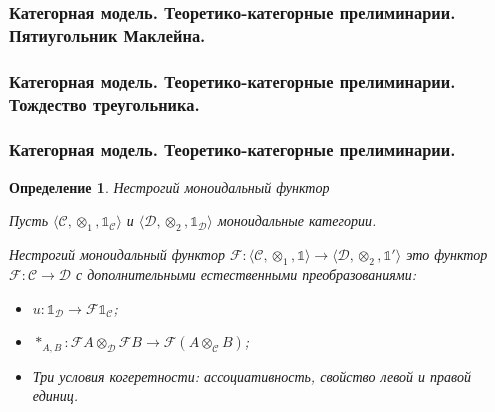 \documentclass[10pt,pdf,utf8,russian,aspectratio=169]{beamer}
\newtheorem{defin}{Определение}
\begin{document}
\begin{frame}
  \frametitle{Категорная модель. Теоретико-категорные прелиминарии. Пятиугольник Маклейна.}


\end{frame}

\begin{frame}
  \frametitle{Категорная модель. Теоретико-категорные прелиминарии. Тождество треугольника.}


\end{frame}

\begin{frame}
  \frametitle{Категорная модель. Теоретико-категорные прелиминарии.}

  \begin{defin} Нестрогий моноидальный функтор

    Пусть $\langle \mathcal{C}, \otimes_1, \mathds{1}_{\mathcal{C}} \rangle$ и $\langle \mathcal{D}, \otimes_2, \mathds{1}_{\mathcal{D}} \rangle$ моноидальные категории.

    Нестрогий моноидальный функтор $\mathcal{F} : \langle \mathcal{C}, \otimes_1, \mathds{1} \rangle \to \langle \mathcal{D}, \otimes_2, \mathds{1}' \rangle$ это функтор
    $\mathcal{F} : \mathcal{C} \to \mathcal{D}$ с дополнительными естественными преобразованиями:

    \begin{itemize}
    \item $u : \mathds{1}_{\mathcal{D}} \to \mathcal{F}\mathds{1}_{\mathcal{C}}$;
    \item $\ast_{A, B} : \mathcal{F}A \otimes_{\mathcal{D}} \mathcal{F}B \to \mathcal{F}(A \otimes_{\mathcal{C}} B)$;
    \item Три условия когеретности: ассоциативность, свойство левой и правой единиц.
    \end{itemize}
  \end{defin}
\end{frame}
\end{document}
